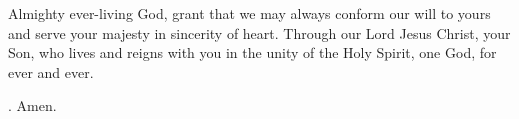 \lettrine[lines=3]{A}{}lmighty ever-living God, grant that we may always conform our will to yours and serve your majesty in sincerity of heart. Through our Lord Jesus Christ, your Son, who lives and reigns with you in the unity of the Holy Spirit, one God, for ever and ever. \par \Rbar. Amen.
